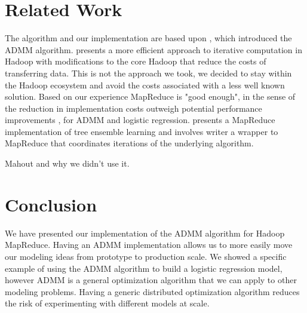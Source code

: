 \documentclass[10pt, conference, compsocconf]{IEEEtran}
\begin{document}
\section{Related Work}\label{sec:related}
The algorithm and our implementation are based upon \cite{boyd}, which introduced the ADMM algorithm.  \cite{bu2010} presents a more efficient approach to iterative computation in Hadoop with modifications to the core Hadoop that reduce the costs of transferring data.  This is not the approach we took, we decided to stay within the Hadoop ecosystem and avoid the costs associated with a less well known solution.  Based on our experience MapReduce is "good enough", in the sense of the reduction in implementation costs outweigh potential performance improvements \cite{lin2012}, for ADMM and logistic regression. \cite{planet} presents a MapReduce implementation of tree ensemble learning and involves writer a wrapper to MapReduce that coordinates iterations of the underlying algorithm.

Mahout and why we didn't use it.  

\section{Conclusion}\label{sec:conc}
We have presented our implementation of the ADMM algorithm for Hadoop MapReduce.  Having an ADMM implementation allows us to more easily move our modeling ideas from prototype to production scale.  We showed a specific example of using the ADMM algorithm to build a logistic regression model, however ADMM is a general optimization algorithm that we can apply to other modeling problems.  Having a generic distributed optimization algorithm reduces the risk of experimenting with different models at scale.







\end{document}
